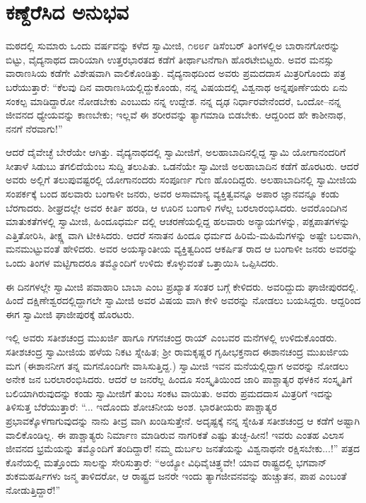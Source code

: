 
\chapter{ಕಣ್ದೆರೆಸಿದ ಅನುಭವ}

\noindent

ಮಠದಲ್ಲಿ ಸುಮಾರು ಒಂದು ವರ್ಷವನ್ನು ಕಳೆದ ಸ್ವಾಮೀಜಿ, ೧೮೮೯ ಡಿಸೆಂಬರ್ ತಿಂಗಳಲ್ಲಿಅ ಬಾರಾನಗೋರನ್ನು ಬಿಟ್ಟು, ವೈದ್ಯನಾಥದ ದಾರಿಯಾಗಿ ಉತ್ತರಭಾರತದ ಕಡೆಗೆ ತೀರ್ಥಾಟನೆಗಾಗಿ ಹೊರಟೇಬಿಟ್ಟರು. ಅವರ ಮನಸ್ಸು ವಾರಾಣಸಿಯ ಕಡೆಗೇ ವಿಶೇಷವಾಗಿ ವಾಲಿಕೊಂಡಿತ್ತು. ವೈದ್ಯನಾಥದಿಂದ ಅವರು ಪ್ರಮದದಾಸ ಮಿತ್ರರಿಗೊಂದು ಪತ್ರ ಬರೆಯುತ್ತಾರೆ: “ಕೆಲವು ದಿನ ವಾರಾಣಸಿಯಲ್ಲಿದ್ದುಕೊಂಡು, ನನ್ನ ವಿಷಯದಲ್ಲಿ ವಿಶ್ವನಾಥ ಅನ್ನಪೂರ್ಣೆಯರು ಏನು ಸಂಕಲ್ಪ ಮಾಡಿದ್ದಾರೋ ನೋಡಬೇಕು ಎಂಬುದು ನನ್ನ ಉದ್ದೇಶ. ನನ್ನ ದೃಢ ನಿರ್ಧಾರವೇನೆಂದರೆ, ಒಂದೋ–ನನ್ನ ಜೀವನದ ಧ್ಯೇಯವನ್ನು ಕಾಣಬೇಕು; ಇಲ್ಲವೆ ಈ ಶರೀರವನ್ನು ತ್ಯಾಗಮಾಡಿ ಬಿಡಬೇಕು. ಆದ್ದರಿಂದ ಹೇ ಕಾಶೀನಾಥ, ನನಗೆ ನೆರವಾಗು!”

ಆದರೆ ದೈವೇಚ್ಛೆ ಬೇರೆಯೇ ಆಗಿತ್ತು. ವೈದ್ಯನಾಥದಲ್ಲಿ ಸ್ವಾಮೀಜಿಗೆ, ಅಲಹಾಬಾದಿನಲ್ಲಿದ್ದ ಸ್ವಾಮಿ ಯೋಗಾನಂದರಿಗೆ ಸೀತಾಳೆ ಸಿಡುಬು ತಗಲಿದೆಯೆಂಬ ಸುದ್ದಿ ತಲುಪಿತು. ಒಡನೆಯೇ ಸ್ವಾಮೀಜಿ ಅಲಹಾಬಾದಿನ ಕಡೆಗೆ ಹೊರಟರು. ಆದರೆ ಅವರು ಅಲ್ಲಿಗೆ ತಲುಪುವಷ್ಟರಲ್ಲಿ ಯೋಗಾನಂದರು ಸಂಪೂರ್ಣ ಗುಣ ಹೊಂದಿದ್ದರು. ಅಲಹಾಬಾದಿನಲ್ಲಿ ಸ್ವಾಮೀಜಿಯ ಸಂಪರ್ಕಕ್ಕೆ ಬಂದ ಹಲವಾರು ಬಂಗಾಳೀ ಜನರು, ಅವರ ಅಸಾಮಾನ್ಯ ವ್ಯಕ್ತಿತ್ವವನ್ನೂ ಅಪಾರ ಜ್ಞಾನವನ್ನೂ ಕಂಡು ಬೆರಗಾದರು. ಶೀಘ್ರದಲ್ಲೇ ಅವರ ಕೀರ್ತಿ ಹರಡಿ, ಆ ಊರಿನ ಬಂಗಾಳಿ ಗಳೆಲ್ಲ ಬರಲಾರಂಭಿಸಿದರು. ಅವರೊಂದಿಗಿನ ಮಾತುಕತೆಗಳಲ್ಲಿ ಸ್ವಾಮೀಜಿ, ಹಿಂದೂಧರ್ಮ ದಲ್ಲಿ ಆಚರಣೆಯಲ್ಲಿದ್ದ ಹಲವಾರು ಅನ್ಯಾಯಗಳನ್ನು, ಪಕ್ಷಪಾತಗಳನ್ನು ಎತ್ತಿತೋರಿಸಿ, ತೀಕ್ಷ್ಣ ವಾಗಿ ಟೀಕಿಸಿದರು. ಆದರೆ ಸನಾತನ ಹಿಂದೂ ಧರ್ಮದ ಹಿರಿಮೆ-ಮಹಿಮೆಗಳನ್ನು ಅಷ್ಟೇ ಬಲವಾಗಿ, ಮನಮುಟ್ಟುವಂತೆ ಹೇಳಿದರು. ಅವರ ಅಯಸ್ಕಾಂತೀಯ ವ್ಯಕ್ತಿತ್ವದಿಂದ ಆಕರ್ಷಿತ ರಾದ ಆ ಬಂಗಾಳೀ ಜನರು ಅವರನ್ನು ಒಂದು ತಿಂಗಳ ಮಟ್ಟಿಗಾದರೂ ತಮ್ಮೊಂದಿಗೆ ಉಳಿದು ಕೊಳ್ಳುವಂತೆ ಒತ್ತಾಯಿಸಿ ಒಪ್ಪಿಸಿದರು.

ಈ ದಿನಗಳಲ್ಲೇ ಸ್ವಾಮೀಜಿ ಪವಾಹಾರಿ ಬಾಬಾ ಎಂಬ ಪ್ರಖ್ಯಾತ ಸಂತರ ಬಗ್ಗೆ ಕೇಳಿದರು. ಅವರಿದ್ದುದು ಘಾಜೀಪುರದಲ್ಲಿ. ಹಿಂದೆ ದಕ್ಷಿಣೇಶ್ವರದಲ್ಲಿದ್ದಾಗಲೇ ಸ್ವಾಮೀಜಿ ಅವರ ವಿಷಯ ವಾಗಿ ಕೇಳಿ ಅವರನ್ನು ನೋಡಲು ಬಯಸಿದ್ದರು. ಆದ್ದರಿಂದ ಈಗ ಸ್ವಾಮೀಜಿ ಘಾಜೀಪುರಕ್ಕೆ ಹೊರಟರು.

ಇಲ್ಲಿ ಅವರು ಸತೀಶಚಂದ್ರ ಮುಖರ್ಜಿ ಹಾಗೂ ಗಗನಚಂದ್ರ ರಾಯ್ ಎಂಬವರ ಮನೆಗಳಲ್ಲಿ ಉಳಿದುಕೊಂಡರು. ಸತೀಶಚಂದ್ರ ಸ್ವಾಮೀಜಿಯ ಹಳೆಯ ನಿಕಟ ಸ್ನೇಹಿತ; ಶ್ರೀ ರಾಮಕೃಷ್ಣರ ಗೃಹೀಭಕ್ತನಾದ ಈಶಾನಚಂದ್ರ ಮುಖರ್ಜಿಯ ಮಗ (ಈಶಾನನೀಗ ತನ್ನ ಮಗನೊಂದಿಗೇ ವಾಸಿಸುತ್ತಿದ್ದ.) ಸ್ವಾಮೀಜಿ ಇವನ ಮನೆಯಲ್ಲಿದ್ದಾಗ ಅವರನ್ನು ನೋಡಲು ಅನೇಕ ಜನ ಬರಲಾರಂಭಿಸಿದರು. ಆದರೆ ಆ ಜನರೆಲ್ಲ ಹಿಂದೂ ಸಂಸ್ಕೃತಿಯಿಂದ ಜಾರಿ ಪಾಶ್ಚಾತ್ಯರ ಥಳಕಿನ ಸಂಸ್ಕೃತಿಗೆ ಬಲಿಯಾಗಿರುವುದನ್ನು ಕಂಡು ಸ್ವಾಮೀಜಿಗೆ ತುಂಬ ಸಂಕಟ ವಾಯಿತು. ಅವರು ಪ್ರಮದದಾಸ ಮಿತ್ರರಿಗೆ ಇದನ್ನು ತಿಳಿಸುತ್ತ ಬೆರೆಯುತ್ತಾರೆ: “... ಇದೊಂದು ಶೋಚನೀಯ ಅಂಶ. ಭಾರತೀಯರು ಪಾಶ್ಚಾತ್ಯರ ಪ್ರಭಾವಕ್ಕೊಳಗಾಗುವುದನ್ನು ನಾನು ತೀವ್ರ ವಾಗಿ ಖಂಡಿಸುತ್ತೇನೆ. ಅದೃಷ್ಟಕ್ಕೆ ನನ್ನ ಸ್ನೇಹಿತ ಸತೀಶಚಂದ್ರ ಆ ಕಡೆಗೆ ಅಷ್ಟಾಗಿ ವಾಲಿಕೊಂಡಿಲ್ಲ. ಈ ಪಾಶ್ಚಾತ್ಯರು ನಿರ್ಮಾಣ ಮಾಡಿರುವ ನಾಗರಿಕತೆ ಎಷ್ಟು ತುಚ್ಛ-ಹೀನ! ಇವರು ಎಂತಹ ವಿಲಾಸ ಜೀವನದ ಭ್ರಮೆಯನ್ನು ತಮ್ಮೊಂದಿಗೆ ತಂದಿದ್ದಾರೆ! ನಮ್ಮ ದುರ್ಬಲ ಜನತೆಯನ್ನು ವಿಶ್ವನಾಥನೇ ರಕ್ಷಿಸಬೇಕು...!” ಪತ್ರದ ಕೊನೆಯಲ್ಲಿ ಮತ್ತೊಂದು ಸಾಲನ್ನು ಸೇರಿಸುತ್ತಾರೆ: “ಅಯ್ಯೋ ವಿಧಿವೈಚಿತ್ರ್ಯವೇ! ಯಾವ ರಾಷ್ಟ್ರದಲ್ಲಿ ಭಗವಾನ್ ಶುಕಮಹರ್ಷಿಗಳು ಜನ್ಮ ತಾಳಿದರೋ, ಆ ರಾಷ್ಟ್ರದ ಜನರೇ ಇಂದು ತ್ಯಾಗಜೀವನವನ್ನು ಹುಚ್ಚುತನ, ಪಾಪ ಎಂಬಂತೆ ನೋಡುತ್ತಿದ್ದಾರೆ!”

